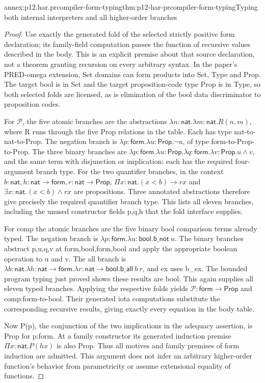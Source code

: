 \begin{annexitem}{annex:p12.har.prcompiler-form-typing}{thm:p12-har-prcompiler-form-typing}{Typing both internal interpreters and all higher-order branches}
\begin{proof}
Use exactly the generated fold of the selected strictly positive form
declaration; its family-field computation passes the function of
recursive values described in the body. This is an explicit premise
about that source declaration, not a theorem granting recursion on
every arbitrary syntax. In the paper's PRED-omega extension, Set
domains can form products into Set, Type and Prop. The target bool
is in Set and the target proposition-code type Prop is in Type, so
both selected folds are licensed, as is elimination of the bool data
discriminator to proposition codes.

For \(\mathcal P\), the five atomic branches are the abstractions
\(\lambda n:\mathsf{nat}.\lambda m:\mathsf{nat}.R(n,m)\),
where R runs through the five Prop relations in the table. Each has
type nat-to-nat-to-Prop. The negation branch is
\(\lambda p:\mathsf{form}.\lambda u:\mathsf{Prop}.\neg u\),
of type form-to-Prop-to-Prop. The three binary branches are
\(\lambda p:\mathsf{form}.\lambda u:\mathsf{Prop}.
\lambda q:\mathsf{form}.\lambda v:\mathsf{Prop}.u\wedge v\),
and the same term with disjunction or implication: each has the
required four-argument branch type. For the two quantifier branches,
in the context \(b:\mathsf{nat},h:\mathsf{nat}\to\mathsf{form},
r:\mathsf{nat}\to\mathsf{Prop}\),
\(\Pi x:\mathsf{nat}.(x<b)\to r x\) and
\(\exists x:\mathsf{nat}.(x<b)\wedge r x\) are propositions.
Three annotated abstractions therefore give precisely the required
quantifier branch type. This lists all eleven branches, including
the unused constructor fields p,q,h that the fold interface supplies.

For comp the atomic branches are the five binary bool comparison
terms already typed. The negation branch is
\(\lambda p:\mathsf{form}.\lambda u:\mathsf{bool}.
\mathsf{b\_not}\ u\). The binary branches abstract p,u,q,v
at form,bool,form,bool and apply the appropriate boolean operation
to u and v. The all branch is
\(\lambda b:\mathsf{nat}.\lambda h:\mathsf{nat}\to\mathsf{form}.
\lambda r:\mathsf{nat}\to\mathsf{bool}.\mathsf{b\_all}\ b\ r\),
and ex uses b\_ex. The bounded program typing just proved shows
these results are bool. This again supplies all eleven typed branches.
Applying the respective folds yields \(\mathcal P:\mathsf{form}\to
\mathsf{Prop}\) and comp:form-to-bool. Their generated iota
computations substitute the corresponding recursive results, giving
exactly every equation in the body table.

Now P(p), the conjunction of the two implications in the adequacy
assertion, is Prop for p:form. At a family constructor its generated
induction premise \(\Pi x:\mathsf{nat}.P(h x)\) is also Prop.
Thus all motives and family premises of form induction are admitted.
This argument does not infer an arbitrary higher-order function's
behavior from parametricity or assume extensional equality of functions.
\end{proof}
\end{annexitem}

